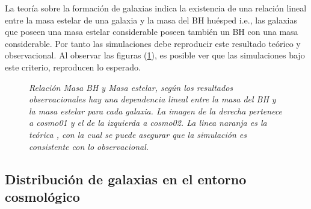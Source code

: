 La teoría sobre la formación de galaxias indica la existencia de una relación lineal entre la masa estelar de una galaxia y la masa del BH huésped \cite{marconi2003} i.e., las galaxias que poseen una masa estelar considerable poseen también un BH con una masa considerable. Por tanto las simulaciones debe reproducir este resultado teórico y observacional. Al observar las figuras (\ref{fig: Mass_bhVsMass_stelar}), es posible ver que las simulaciones bajo este criterio, reproducen lo esperado. 
%
 \begin{figure}
 \centering
 \caption[Relación Masa BH y Masa estelar]{\emph{Relación Masa BH y Masa estelar, según los resultados observacionales hay una dependencia lineal entre la masa del BH y la masa estelar para cada galaxia. La imagen de la derecha pertenece a {\it{cosmo01}} y el de la izquierda a {\it{cosmo02}}. La linea naranja es la teórica \cite{McConnell2013}, con la cual se puede asegurar que la simulación es consistente con lo observacional.}}
 \label{fig: Mass_bhVsMass_stelar}
\end{figure}
%
    \subsection{ Distribución de galaxias en el entorno cosmológico}
    \label{subsec: Distribucion de galaxias}

